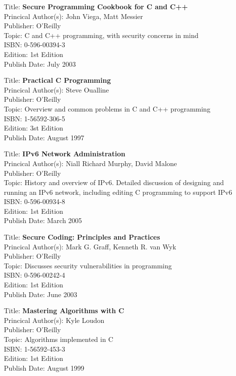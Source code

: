 
Title: 	\textbf{Secure Programming Cookbook for C and C++}	\\
Princical Author(s): 	John Viega, Matt Messier  \\
Publisher:	O'Reilly	\\	
Topic:		C and C++ programming, with security concerns in mind \\
ISBN:			0-596-00394-3 \\
Edition:		1st Edition \\
Publish Date:		July 2003

	
Title: 	\textbf{Practical C Programming}	\\
Princical Author(s): 	Steve Oualline  \\
Publisher:	O'Reilly	\\	
Topic:		Overview and common problems in C and C++ programming \\
ISBN:			1-56592-306-5 \\
Edition:		3st Edition \\
Publish Date:		August 1997


Title: 	\textbf{IPv6 Network Administration}	\\
Princical Author(s): 	Niall Richard Murphy, David Malone  \\
Publisher:	O'Reilly	\\	
Topic:		History and overview of IPv6. Detailed discussion of
designing and running an IPv6 network, including editing C programming
to support IPv6 \\
ISBN:			0-596-00934-8 \\
Edition:		1st Edition \\
Publish Date:		March 2005


Title: 	\textbf{Secure Coding: Principles and Practices}	\\
Princical Author(s): 	Mark G. Graff, Kenneth R. van Wyk  \\
Publisher:	O'Reilly	\\	
Topic:		Discusses security vulnerabilities in programming \\
ISBN:			0-596-00242-4 \\
Edition:		1st Edition \\
Publish Date:		June 2003


Title: 	\textbf{Mastering Algorithms with C}	\\
Princical Author(s): 	Kyle Loudon  \\
Publisher:	O'Reilly	\\	
Topic:		Algorithms implemented in C \\
ISBN:			1-56592-453-3 \\
Edition:		1st Edition \\
Publish Date:		August 1999


